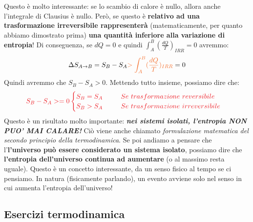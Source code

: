                 Questo è molto interessante: se lo scambio di calore è nullo, allora anche l'integrale di Clausius è nullo. Però, se questo è \textbf{relativo ad una trasformazione irreversibile rappresenterà} (matematicamente, per quanto abbiamo dimostrato prima) \textbf{una quantità inferiore alla variazione di entropia}! Di conseguenza, se $dQ = 0$ e quindi $\int_A^B (\frac{dQ}{T})_{IRR} = 0$ avremmo:
                \begin{align*}
                    \Delta S_{A\rightarrow B} = S_B-S_A \textcolor{Orange}{>\int_A^B (\frac{dQ}{T})_{IRR}} = 0
                \end{align*}
                Quindi avremmo che $S_B-S_A > 0$. Mettendo tutto insieme, possiamo dire che:
                \begin{align*}
                    \textcolor{Red}{S_B-S_A >= 0
                    \begin{cases}
                        S_B = S_A \ \ \ \ \ \ \ \ Se\ trasformazione\ reversibile\\
                        S_B > S_A \ \ \ \ \ \ \ \ Se\ trasformazione\ irreversibile
                    \end{cases}}
                \end{align*}
                Questo è un risultato molto importante: \textbf{\textit{nei sistemi isolati, l'entropia NON PUO' MAI CALARE!}} Ciò viene anche chiamato \textit{formulazione matematica del secondo principio della termodinamica}. Se poi andiamo a pensare che l'\textbf{l'universo può essere considerato un sistema isolato}, possiamo dire che \textbf{l'entropia dell'universo continua ad aumentare} (o al massimo resta uguale). Questo è un concetto interessante, da un senso fisico al tempo se ci pensiamo. In natura (fisicamente parlando), un evento avviene solo nel senso in cui aumenta l'entropia dell'universo!


    \subsection{Esercizi termodinamica}
